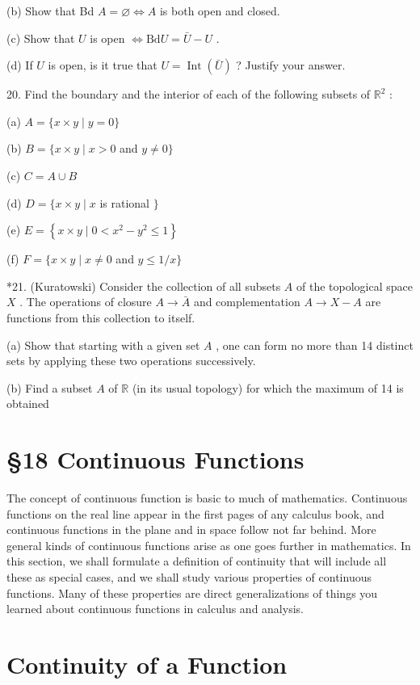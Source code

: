 (b) Show that Bd \(A = \varnothing  \Leftrightarrow  A\) is both open and closed.

(c) Show that \(U\) is open \(\Leftrightarrow  \mathrm{{Bd}}U = \bar{U} - U\) .

(d) If \(U\) is open, is it true that \(U = \operatorname{Int}\left( \bar{U}\right)\) ? Justify your answer.

20. Find the boundary and the interior of each of the following subsets of \({\mathbb{R}}^{2}\) :

(a) \(A = \{ x \times  y \mid  y = 0\}\)

(b) \(B = \{ x \times  y \mid  x > 0\) and \(y \neq  0\}\)

(c) \(C = A \cup  B\)

(d) \(D = \{ x \times  y \mid  x\) is rational \(\}\)

(e) \(E = \left\{  {x \times  y \mid  0 < {x}^{2} - {y}^{2} \leq  1}\right\}\)

(f) \(F = \{ x \times  y \mid  x \neq  0\) and \(y \leq  1/x\}\)

*21. (Kuratowski) Consider the collection of all subsets \(A\) of the topological space \(X\) . The operations of closure \(A \rightarrow  \bar{A}\) and complementation \(A \rightarrow  X - A\) are functions from this collection to itself.

(a) Show that starting with a given set \(A\) , one can form no more than 14 distinct sets by applying these two operations successively.

(b) Find a subset \(A\) of \(\mathbb{R}\) (in its usual topology) for which the maximum of 14 is obtained

\section*{§18 Continuous Functions}

The concept of continuous function is basic to much of mathematics. Continuous functions on the real line appear in the first pages of any calculus book, and continuous functions in the plane and in space follow not far behind. More general kinds of continuous functions arise as one goes further in mathematics. In this section, we shall formulate a definition of continuity that will include all these as special cases, and we shall study various properties of continuous functions. Many of these properties are direct generalizations of things you learned about continuous functions in calculus and analysis.

\section*{Continuity of a Function}

